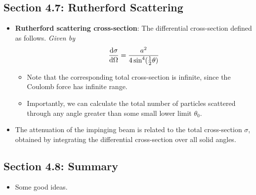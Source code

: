 \documentclass[../notes.tex]{subfiles}
\begin{document}
\subsection*{Section 4.7: Rutherford Scattering}
\begin{itemize}
    \item \textbf{Rutherford scattering cross-section}: The differential cross-section defined as follows. \emph{Given by}
    \begin{equation*}
        \dv{\sigma}{\Omega} = \frac{a^2}{4\sin^4(\frac{1}{2}\theta)}
    \end{equation*}
    \begin{itemize}
        \item Note that the corresponding total cross-section is infinite, since the Coulomb force has infinite range.
        \item Importantly, we can calculate the total number of particles scattered through any angle greater than some small lower limit $\theta_0$.
    \end{itemize}
    \item The attenuation of the impinging beam is related to the total cross-section $\sigma$, obtained by integrating the differential cross-section over all solid angles.
\end{itemize}


\subsection*{Section 4.8: Summary}
\begin{itemize}
    \item Some good ideas.
\end{itemize}
\end{document}
